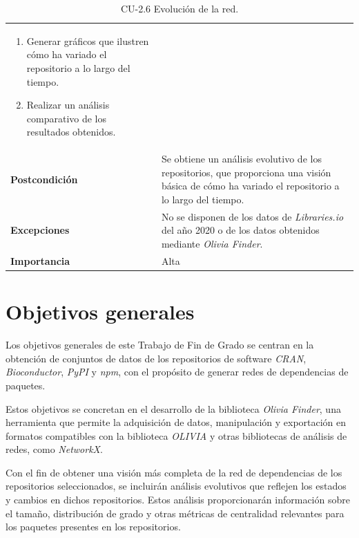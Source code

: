 \begin{table}[p]
\begin{tabularx}{\linewidth}{ p{} p{} }
\begin{enumerate}
			                                \item Generar gráficos que ilustren cómo ha variado el repositorio a lo largo del tiempo.
			                                \item Realizar un análisis comparativo de los resultados obtenidos.
		                                \end{enumerate}                                                              \\
		\textbf{Postcondición}        & Se obtiene un análisis evolutivo de los repositorios, que proporciona una visión básica de cómo ha variado el repositorio a lo largo del tiempo.                                          \\
		\textbf{Excepciones}          & No se disponen de los datos de \textit{Libraries.io} del año 2020 o de los datos obtenidos mediante \textit{Olivia Finder}.                                                               \\
		\textbf{Importancia}          & Alta                                                                                                                                                                                      \\
		\bottomrule
	\end{tabularx}
	\caption{CU-2.6 Evolución de la red.}
	\label{tab:cu2.6}
\end{table}


\section{Objetivos generales}

Los objetivos generales de este Trabajo de Fin de Grado se centran en la obtención de conjuntos de
datos de los repositorios de software \textit{CRAN}, \textit{Bioconductor}, \textit{PyPI} y \textit{npm},
con el propósito de generar redes de dependencias de paquetes.

Estos objetivos se concretan en el desarrollo de la biblioteca \textit{Olivia Finder}, una herramienta
que permite la adquisición de datos, manipulación y exportación en formatos compatibles con la
biblioteca \textit{OLIVIA} y otras bibliotecas de análisis de redes, como \textit{NetworkX}.

Con el fin de obtener una visión más completa de la red de dependencias de los repositorios
seleccionados, se incluirán análisis evolutivos que reflejen los estados y cambios en dichos repositorios.
Estos análisis proporcionarán información sobre el tamaño, distribución de grado y otras métricas de
centralidad relevantes para los paquetes presentes en los repositorios.

